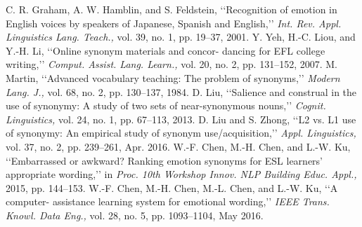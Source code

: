 \documentclass[a4paper,12pt,oneside]{article}
\begin{document}
\begin{thebibliography}{9}
 C. R. Graham, A. W. Hamblin, and S. Feldstein, ‘‘Recognition of emotion in English voices by speakers of Japanese, Spanish and English,’’ \emph{Int. Rev. Appl. Linguistics Lang. Teach.,} vol. 39, no. 1, pp. 19–37, 2001.
 Y. Yeh, H.-C. Liou, and Y.-H. Li, ‘‘Online synonym materials and concor- dancing for EFL college writing,’’ \emph{Comput. Assist. Lang. Learn.,} vol. 20, no. 2, pp. 131–152, 2007.
 M. Martin, ‘‘Advanced vocabulary teaching: The problem of synonyms,’’ \emph{Modern Lang. J.,} vol. 68, no. 2, pp. 130–137, 1984.
 D. Liu, ‘‘Salience and construal in the use of synonymy: A study of two sets of near-synonymous nouns,’’ \emph{Cognit. Linguistics,} vol. 24, no. 1, pp. 67–113, 2013.
 D. Liu and S. Zhong, ‘‘L2 vs. L1 use of synonymy: An empirical study of synonym use/acquisition,’’ \emph{Appl. Linguistics,} vol. 37, no. 2, pp. 239–261, Apr. 2016.
 W.-F. Chen, M.-H. Chen, and L.-W. Ku, ‘‘Embarrassed or awkward? Ranking emotion synonyms for ESL learners’ appropriate wording,’’ in \emph{Proc. 10th Workshop Innov. NLP Building Educ. Appl.,} 2015, pp. 144–153.
 W.-F. Chen, M.-H. Chen, M.-L. Chen, and L.-W. Ku, ‘‘A computer- assistance learning system for emotional wording,’’ \emph{IEEE Trans. Knowl. Data Eng.,} vol. 28, no. 5, pp. 1093–1104, May 2016.
\end{thebibliography}
\end{document}
